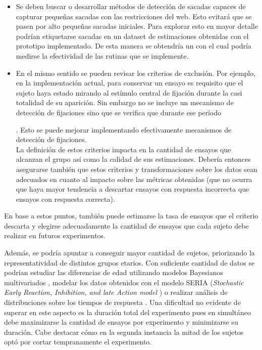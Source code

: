   \begin{itemize}

    \item
      Se deben buscar o desarrollar métodos de detección de sacadas capaces de
      capturar pequeñas sacadas con las restricciones del \eyetracking web.
      Esto evitará que se pasen por alto pequeñas sacadas iniciales.
      Para explorar esto en mayor detalle podrían etiquetarse sacadas en un
      dataset de estimaciones obtenidas con el prototipo implementado.
      De esta manera se obtendría un \groundtruth con el cual podría medirse la
      efectividad de las rutinas que se implemente.
   
    \item
      En el mismo sentido se pueden revisar los criterios de exclusión.
      Por ejemplo, en la implementación actual, para conservar un ensayo es
      requisito que el sujeto haya estado mirando al estímulo central de
      fijación durante la casi totalidad de su aparición.
      Sin embargo no se incluye un mecanismo de detección de fijaciones sino
      que se verifica que durante ese período .
      Esto se puede mejorar implementando efectivamente mecanismos de detección
      de fijaciones. \\
      La definición de estos criterios impacta en la cantidad de ensayos que
      alcanzan el grupo \inlier así como la calidad de sus estimaciones.
      Debería entonces asegurarse también que estos criterios y
      transformaciones sobre los datos sean adecuados en cuanto al impacto
      sobre las métricas obtenidas (\eg que no ocurra que haya mayor tendencia
      a descartar ensayos con respuesta incorrecta que ensayos con respuesta
      correcta).

  \end{itemize}

  En base a estos puntos, también puede estimarse la tasa de ensayos que el
  criterio descarta y elegirse adecuadamente la cantidad de ensayos que cada
  sujeto debe realizar en futuros experimentos.

  Además, se podría apuntar a conseguir mayor cantidad de sujetos, priorizando
  la representatividad de distintos grupos etarios.
  Con suficiente cantidad de datos se podrían estudiar las diferencias de edad
  utilizando modelos Bayesianos multivariados
  \cite{plomecka_2020_retest_reliability}, modelar los datos obtenidos con el
  modelo SERIA (\textit{Stochastic Early Reaction, Inhibition, and late Action
  model} \cite{aponte_2017_seria}) o realizar análisis de distribuciones sobre
  los tiempos de respuesta \cite{unsworth_2011_distribution_analysis}.
  Una dificultad no evidente de superar en este aspecto es la duración total
  del experimento pues en simultáneo debe maximizarse la cantidad de ensayos
  por experimento y minimizarse su duración.
  Cabe destacar cómo en la segunda instancia la mitad de los sujetos optó por
  cortar tempranamente el experimento.

